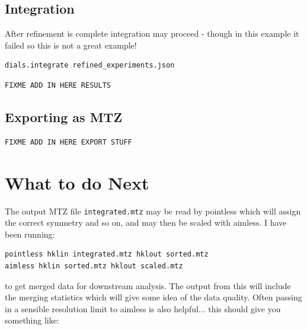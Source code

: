\documentclass[a4paper, 11pt]{article}
\begin{document}
\subsection{Integration}

After refinement is complete integration may proceed - though in this
example it failed so this is not a great example!


{\small
\begin{verbatim}
dials.integrate refined_experiments.json 
\end{verbatim}
}

{\small
\begin{verbatim}
FIXME ADD IN HERE RESULTS
\end{verbatim}
}

\subsection{Exporting as MTZ}

{\small
\begin{verbatim}
FIXME ADD IN HERE EXPORT STUFF
\end{verbatim}
}

\section{What to do Next}

The output MTZ file \verb|integrated.mtz| may be read by pointless which will assign the correct symmetry and so on, and may then be scaled with aimless. I have been running:

{\small
\begin{verbatim}
pointless hklin integrated.mtz hklout sorted.mtz
aimless hklin sorted.mtz hklout scaled.mtz
\end{verbatim}
}

\noindent
to get merged data for downstream analysis. The output from this will
include the merging statistics which will give some idea of the data
quality. Often passing in a sensible resolution limit to aimless is
also helpful... this should give you something like:
\end{document}
